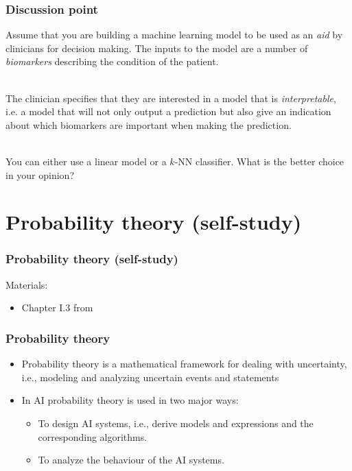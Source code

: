 \documentclass[notes]{beamer}          %
\newif\iffull
\begin{document}
\begin{frame}
\frametitle{Discussion point}
Assume that you are building a machine learning model to be used as an \textit{aid} by clinicians for decision making. The inputs to the model are a number of \textit{biomarkers} describing the condition of the patient.
\\~\

The clinician specifies that they are interested in a model that is \textit{interpretable}, i.e. a model that will not only output a prediction but also give an indication about which biomarkers are important when making the prediction.
\\~\

You can either use a linear model or a $k$-NN classifier. What is the better choice in your opinion?

\end{frame}

\iffull
\section{Probability theory}
\else
\section{Probability theory (self-study)}
\fi

\begin{frame}
\iffull
\frametitle{Probability theory}
\else
\frametitle{Probability theory (self-study)}
\fi
Materials:
\begin{itemize}
    \item Chapter I.3 from \cite{deeplearning}
\end{itemize}
\end{frame}

\iffull

\begin{frame}
\frametitle{Probability theory}
\begin{itemize}
    \item Probability theory is a mathematical framework for dealing with uncertainty, i.e., modeling and analyzing uncertain events and statements
    \item In AI probability theory is used in two major ways:
        \begin{itemize}
            \item To design AI systems, i.e., derive models and expressions and the corresponding algorithms.
            \item To analyze the behaviour of the AI systems.
        \end{itemize}

\end{itemize}

\end{frame}
\end{document}
